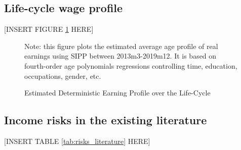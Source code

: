 
\subsection{Life-cycle wage profile}
\label{appendix:life-cycle-determinstic}

\begin{center}
[INSERT FIGURE \ref{fig:life-cycle-determinstic} HERE]  
\end{center}

 \begin{figure}[!ht]
    	\caption{Estimated Deterministic Earning Profile over the Life-Cycle}
    	\label{fig:life-cycle-determinstic}
    	\begin{center}
    	\end{center}
    	\begin{flushleft}Note:  this figure plots the estimated average age profile of real earnings using SIPP between 2013m3-2019m12. It is based on fourth-order age polynomials regressions controlling time, education, occupations, gender, etc.\end{flushleft}
    \end{figure}
    
    
\subsection{Income risks in the existing literature}

\begin{center}
[INSERT TABLE \ref{tab:risks_literature} HERE]  
\end{center}

